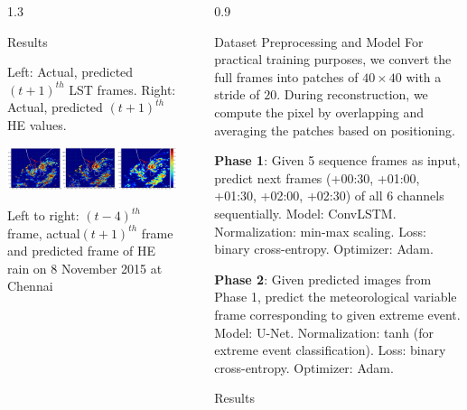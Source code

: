 \documentclass[final]{beamer}
\newlength{\sepwidth}
\newlength{\colwidth}
\newcommand{\separatorcolumn}{\begin{column}{\sepwidth}\end{column}}
\begin{document}
\begin{frame}[t]
\begin{columns}[t]
\begin{column}{1.3\colwidth}
\begin{block}{Results}
\begin{center}
    Left: Actual, predicted $(t+1)^{th}$ LST frames. Right: Actual, predicted $(t+1)^{th}$ HE values. 
    \end{center}  
    
     \begin{center}
    \includegraphics[width=0.7\columnwidth]{example-chennai.jpg}
    
    Left to right: $(t-4)^{th}$ frame, actual$(t+1)^{th}$ frame and predicted frame of HE rain on 8 November 2015 at Chennai
    \end{center}  
    
    
  
\end{block}

\end{column}

\separatorcolumn

\begin{column}{0.9\colwidth}

\begin{block}{Dataset Preprocessing and Model}
For practical training purposes, we convert the full frames into patches of $40\times40$ with a stride of $20$. During reconstruction, we compute the pixel by overlapping and averaging the patches based on positioning. 

\textbf{Phase 1}: Given 5 sequence frames as input, predict next frames (+00:30, +01:00, +01:30, +02:00, +02:30) of all 6 channels sequentially. Model: ConvLSTM. Normalization: min-max scaling. Loss: binary cross-entropy. Optimizer: Adam. 

\textbf{Phase 2}: Given predicted images from Phase 1, predict the meteorological variable frame corresponding to given extreme event. Model: U-Net. Normalization: tanh (for extreme event classification). Loss: binary cross-entropy. Optimizer: Adam. 

\end{block}

\begin{block}{Results}


\end{block}
\end{column}
\end{columns}
\end{frame}
\end{document}
